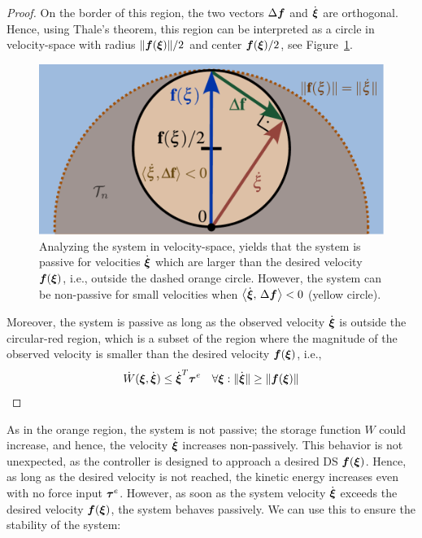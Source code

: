 \begin{proof}
On the border of this region, the two vectors $\Delta \boldsymbol{f}$ and $\dot{{\boldsymbol{\xi}}}$ are orthogonal.
Hence, using Thale's theorem, this region can be interpreted as a circle in velocity-space with radius $\| \boldsymbol{f} ({\boldsymbol{\xi}}) \| / 2$ and center $\boldsymbol{f}({\boldsymbol{\xi}}) / 2$, see Figure~\ref{fig:passivity_analysis}.

\begin{figure}[thb]
	\centering
    \includegraphics[width=1.0\columnwidth]{figures/passivity_analysis}
	\caption{Analyzing the system in velocity-space, yields that the system is passive for velocities $\dot{\boldsymbol{\xi}}$ which are larger than the desired velocity $\boldsymbol{f}(\boldsymbol{\xi})$, i.e., outside the dashed orange circle.
    However, the system can be non-passive for small velocities when  $\left\langle {\dot{\boldsymbol{\xi}}}, \, {\Delta \boldsymbol{f}} \right\rangle < 0$ (yellow circle). }
	\label{fig:passivity_analysis}
\end{figure}

Moreover, the system is passive as long as the observed velocity $\dot{{\boldsymbol{\xi}}}$ is outside the circular-red region, which is a subset of the region where the magnitude of the observed velocity is smaller than the desired velocity $\boldsymbol{f}({\boldsymbol{\xi}})$, i.e.,
\begin{equation}
	\dot W({\boldsymbol{\xi}}, \dot{{\boldsymbol{\xi}}}) \leq \dot{{\boldsymbol{\xi}}}^T \boldsymbol{\tau}^e
 \quad \forall {\boldsymbol{\xi}} : \| \dot{{\boldsymbol{\xi}}} \| \geq\| \boldsymbol{f}({\boldsymbol{\xi}}) \| 
\end{equation}

\end{proof}

As in the orange region, the system is not passive; the storage function $W$ could increase, and hence, the velocity $\dot {\boldsymbol{\xi}}$ increases non-passively. This behavior is not unexpected, as the controller is designed to approach a desired DS $\boldsymbol{f}({\boldsymbol{\xi}})$. Hence, as long as the desired velocity is not reached, the kinetic energy increases even with no force input $\boldsymbol{\tau}^e$. However, as soon as the system velocity $\dot{\boldsymbol{\xi}}$ exceeds the desired velocity $\boldsymbol{f}(\boldsymbol{\xi})$, the system behaves passively. We can use this to ensure the stability of the system:

